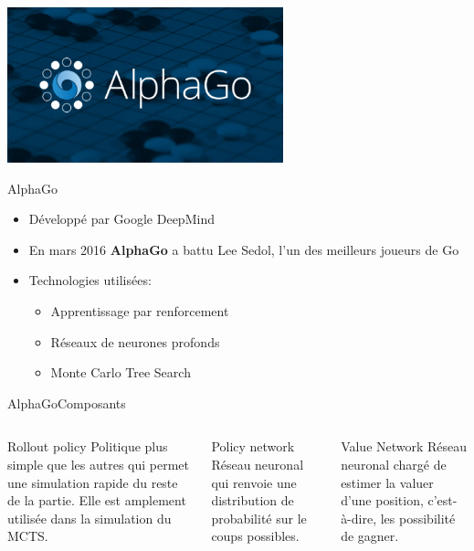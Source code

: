 \begin{frame}
	\begin{center}
		\includegraphics[width=8cm]{ressources/AlphaGoLogo}

	\end{center}
\end{frame}


\begin{frame}{AlphaGo}
	\begin{itemize}
		\item Développé par Google DeepMind
		\item En mars 2016 \textbf{AlphaGo} a battu Lee Sedol, l'un des meilleurs joueurs de Go
		\item Technologies utilisées:
		      \begin{itemize}
			      \item Apprentissage par renforcement
			      \item Réseaux de neurones profonds
			      \item Monte Carlo Tree Search
		      \end{itemize}
	\end{itemize}
\end{frame}



\begin{frame}{AlphaGo}{Composants}
	\begin{columns}[t]
		\begin{column}{.3\textwidth}
			\begin{block}{Rollout policy}
				Politique plus simple que les autres qui permet une simulation rapide du reste de la partie. Elle est amplement utilisée dans la simulation du MCTS.
			\end{block}
		\end{column}
		\begin{column}{.3\textwidth}
			\begin{block}{Policy network}
				Réseau neuronal qui renvoie une distribution de probabilité sur le coups possibles.
			\end{block}
		\end{column}
		\begin{column}{.3\textwidth}
			\begin{block}{Value Network}
				Réseau neuronal chargé de estimer la valuer d'une position, c'est-à-dire, les possibilité de gagner.
			\end{block}
		\end{column}
	\end{columns}
\end{frame}

